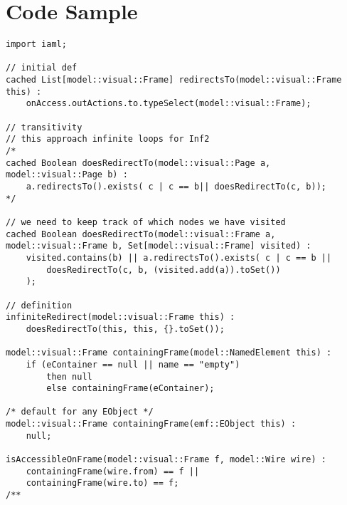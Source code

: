 \chapter{Code Sample}

\begin{verbatim}
import iaml;

// initial def
cached List[model::visual::Frame] redirectsTo(model::visual::Frame this) :
	onAccess.outActions.to.typeSelect(model::visual::Frame);

// transitivity
// this approach infinite loops for Inf2
/*
cached Boolean doesRedirectTo(model::visual::Page a, model::visual::Page b) :
	a.redirectsTo().exists( c | c == b|| doesRedirectTo(c, b));
*/

// we need to keep track of which nodes we have visited
cached Boolean doesRedirectTo(model::visual::Frame a, model::visual::Frame b, Set[model::visual::Frame] visited) :
	visited.contains(b) || a.redirectsTo().exists( c | c == b || 
		doesRedirectTo(c, b, (visited.add(a)).toSet())
	);

// definition
infiniteRedirect(model::visual::Frame this) :
	doesRedirectTo(this, this, {}.toSet());
	
model::visual::Frame containingFrame(model::NamedElement this) :
	if (eContainer == null || name == "empty") 
		then null
		else containingFrame(eContainer);

/* default for any EObject */
model::visual::Frame containingFrame(emf::EObject this) :
	null;
	
isAccessibleOnFrame(model::visual::Frame f, model::Wire wire) :
	containingFrame(wire.from) == f ||
	containingFrame(wire.to) == f;
/**\end{verbatim}
